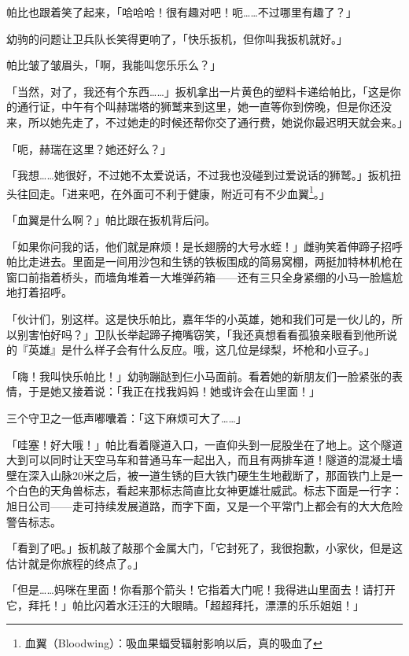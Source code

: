 帕比也跟着笑了起来，「哈哈哈！很有趣对吧！呃……不过哪里有趣了？」

幼驹的问题让卫兵队长笑得更响了，「快乐扳机，但你叫我扳机就好。」

帕比皱了皱眉头，「啊，我能叫您乐乐么？」

「当然，对了，我还有个东西……」扳机拿出一片黄色的塑料卡递给帕比，「这是你的通行证，中午有个叫赫瑞塔的狮鹫来到这里，她一直等你到傍晚，但是你还没来，所以她先走了，不过她走的时候还帮你交了通行费，她说你最迟明天就会来。」

「呃，赫瑞在这里？她还好么？」

「我想……她很好，不过她不太爱说话，不过我也没碰到过爱说话的狮鹫。」扳机扭头往回走。「进来吧，在外面可不利于健康，附近可有不少血翼\footnote{血翼（Bloodwing）：吸血果蝠受辐射影响以后，真的吸血了}。」

「血翼是什么啊？」帕比跟在扳机背后问。

「如果你问我的话，他们就是麻烦！是长翅膀的大号水蛭！」雌驹笑着伸蹄子招呼帕比走进去。里面是一间用沙包和生锈的铁板围成的简易窝棚，两挺加特林机枪在窗口前指着桥头，而墙角堆着一大堆弹药箱——还有三只全身紧绷的小马一脸尴尬地打着招呼。

「伙计们，别这样。这是快乐帕比，嘉年华的小英雄，她和我们可是一伙儿的，所以别害怕好吗？」卫队长举起蹄子掩嘴窃笑，「我还真想看看孤狼亲眼看到他所说的『英雄』是什么样子会有什么反应。哦，这几位是绿梨，坏枪和小豆子。」

「嗨！我叫快乐帕比！」幼驹蹦跶到仨小马面前。看着她的新朋友们一脸紧张的表情，于是她又接着说：「我正在找我妈妈！她或许会在山里面！」

三个守卫之一低声嘟囔着：「这下麻烦可大了……」

\horizonline


「哇塞！好大哦！」帕比看着隧道入口，一直仰头到一屁股坐在了地上。这个隧道大到可以同时让天空马车和普通马车一起出入，而且有两排车道！隧道的混凝土墙壁在深入山脉20米之后，被一道生锈的巨大铁门硬生生地截断了，那面铁门上是一个白色的天角兽标志，看起来那标志简直比女神更雄壮威武。标志下面是一行字：旭日公司——走可持续发展道路，而字下面，又是一个平常门上都会有的大大危险警告标志。

「看到了吧。」扳机敲了敲那个金属大门，「它封死了，我很抱歉，小家伙，但是这估计就是你旅程的终点了。」

「但是……妈咪在里面！你看那个箭头！它指着大门呢！我得进山里面去！请打开它，拜托！」帕比闪着水汪汪的大眼睛。「超超拜托，漂漂的乐乐姐姐！」

